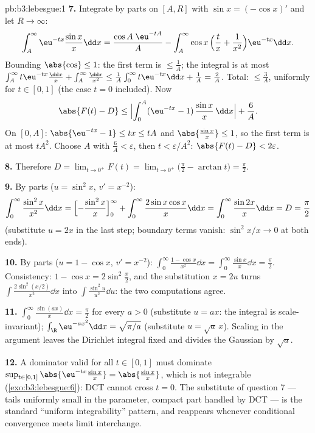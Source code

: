 \begin{solution}{pb:b3:lebesgue:1}
\textbf{7.} Integrate by parts on $[A, R]$ with $\sin x =
(-\cos x)'$ and let $R \to \infty$:
\[
\int_A^{\infty}\eu^{-tx}\frac{\sin x}x\dd x
= \frac{\cos A\;\eu^{-tA}}{A}
- \int_A^\infty \cos x\,\Bigl(\frac tx +
\frac1{x^2}\Bigr)\eu^{-tx}\dd x .
\]
Bounding $\abs{\cos} \leq 1$: the first term is $\leq \frac1A$;
the integral is at most $\int_A^\infty t\eu^{-tx}\frac{\dd x}x
+ \int_A^\infty\frac{\dd x}{x^2} \leq \frac1A\int_0^\infty
t\eu^{-tx}\dd x + \frac1A = \frac2A$. Total: $\leq \frac 3A$,
uniformly for $t \in [0, 1]$ (the case $t = 0$ included). Now
\[
\abs{F(t) - D} \leq
\Bigl|\int_0^A(\eu^{-tx} - 1)\,\frac{\sin x}x\,\dd x\Bigr| +
\frac6A .
\]
On $[0, A]$: $\abs{\eu^{-tx} - 1} \leq tx \leq tA$ and
$\abs{\frac{\sin x}x} \leq 1$, so the first term is at most
$tA^2$. Choose $A$ with $\frac6A < \varepsilon$, then $t <
\varepsilon/A^2$: $\abs{F(t) - D} < 2\varepsilon$.

\textbf{8.} Therefore $D = \lim_{t\to0^+}F(t) =
\lim_{t\to0^+}\bigl(\frac\pi2 - \arctan t\bigr) =
\frac\pi2$.

\textbf{9.} By parts ($u = \sin^2x$, $v' = x^{-2}$):
\[
\int_0^\infty\frac{\sin^2x}{x^2}\dd x
= \Bigl[-\frac{\sin^2x}{x}\Bigr]_0^\infty +
\int_0^\infty\frac{2\sin x\cos x}{x}\dd x
= \int_0^\infty\frac{\sin 2x}{x}\dd x = D = \frac\pi2
\]
(substitute $u = 2x$ in the last step; boundary terms vanish:
$\sin^2 x/x \to 0$ at both ends).

\textbf{10.} By parts ($u = 1 - \cos x$, $v' = x^{-2}$):
$\int_0^\infty\frac{1 - \cos x}{x^2}\dd x =
\int_0^\infty\frac{\sin x}x\dd x = \frac\pi2$. Consistency:
$1 - \cos x = 2\sin^2\frac x2$, and the substitution $x = 2u$
turns $\int\frac{2\sin^2(x/2)}{x^2}\dd x$ into
$\int\frac{\sin^2u}{u^2}\dd u$: the two computations agree.

\textbf{11.} $\int_0^\infty\frac{\sin(ax)}x\dd x = \frac\pi2$
for every $a > 0$ (substitute $u = ax$: the integral is
scale-invariant); $\int_\R\eu^{-ax^2}\dd x = \sqrt{\pi/a}$
(substitute $u = \sqrt a\,x$). Scaling in the argument leaves
the Dirichlet integral fixed and divides the Gaussian by
$\sqrt a$.

\textbf{12.} A dominator valid for all $t \in [0,1]$ must
dominate $\sup_{t\in[0,1]}\abs{\eu^{-tx}\frac{\sin
x}x} = \abs{\frac{\sin x}x}$, which is not integrable
(\cref{exo:b3:lebesgue:6}): DCT cannot cross $t = 0$. The
substitute of question 7 --- tails uniformly small in the
parameter, compact part handled by DCT --- is the standard
``uniform integrability'' pattern, and reappears whenever
conditional convergence meets limit interchange.


\end{solution}
